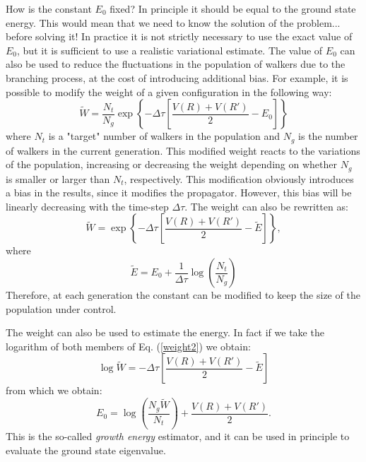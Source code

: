 How is the constant $E_0$ fixed? In principle it should be equal to the ground state energy. This would mean that we need to know the solution of the problem... before solving it! In practice it is not strictly necessary to use the exact value of $E_0$, but it is sufficient to use a realistic variational estimate. The value of $E_0$ can also be used to reduce the fluctuations in the population of walkers due to the branching process, at the cost of introducing additional bias.
For example, it is possible to modify the weight of a given configuration in the following way:
\begin{equation}
\tilde{W}=\frac{N_{t}}{N_g}\exp\left\{ -\Delta\tau\left[\frac{V(R)+V(R')}{2}-E_0\right]\right\}
\end{equation}
where $N_t$ is a "target" number of walkers in the population and $N_g$ is the number of walkers in the current generation. This modified weight reacts to the variations of the population, increasing or decreasing the weight depending on whether $N_g$ is smaller or larger than $N_t$, respectively.
This modification obviously introduces a bias in the results, since it modifies the propagator. However, this bias will be linearly decreasing with the time-step $\Delta\tau$. The weight can  also be rewritten as:
\begin{equation}
\tilde{W}=\exp\left\{ -\Delta\tau\left[\frac{V(R)+V(R')}{2}-\tilde{E}\right]\right\},\label{weight2}
\end{equation}
where
\begin{equation}
\tilde{E}=E_0+\frac{1}{\Delta\tau}\log\left(\frac{N_t}{N_g}\right)
\end{equation}
Therefore, at each generation the constant can be modified to keep the size of the population under control. 

The weight can also be used to estimate the energy. In fact if we take the logarithm of both members of Eq. (\ref{weight2}) we obtain:
\begin{equation}
\log{\tilde{W}}=-\Delta\tau\left[\frac{V(R)+V(R')}{2}-\tilde{E}\right]
\end{equation}
from which we obtain:
\begin{equation}
E_0=\log\left(\frac{N_g\tilde{W}}{N_t}\right)+\frac{V(R)+V(R')}{2}.
\end{equation}
This is the so-called {\it growth energy} estimator, and it can be used in principle to evaluate the
ground state eigenvalue.


